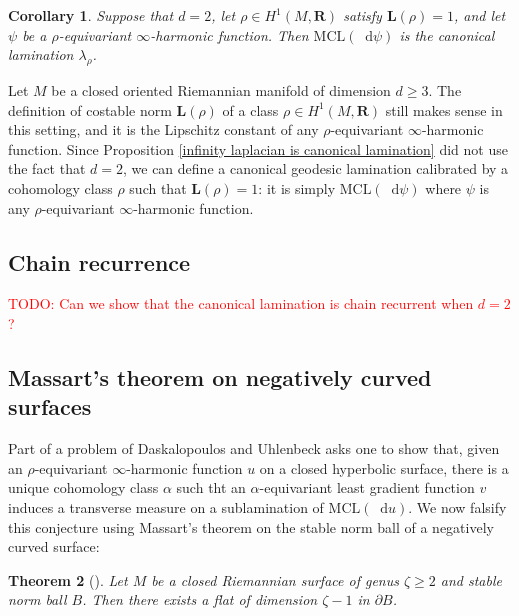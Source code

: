 \documentclass[reqno,11pt]{amsart}
\newcommand{\RR}{\mathbf{R}}
\newcommand*\dif{\mathop{}\!\mathrm{d}}
\newcommand{\MCL}{\mathrm{MCL}}
\newcommand{\Comass}{\mathbf L}
\newtheorem{theorem}{Theorem}[section]
\newtheorem{corollary}[theorem]{Corollary}
\theoremstyle{definition}
\numberwithin{equation}{section}
\newcommand\todo[1]{\textcolor{red}{TODO: #1}}
\begin{document}
\begin{corollary}
Suppose that $d = 2$, let $\rho \in H^1(M, \RR)$ satisfy $\Comass(\rho) = 1$, and let $\psi$ be a $\rho$-equivariant $\infty$-harmonic function.
Then $\MCL(\dif \psi)$ is the canonical lamination $\lambda_\rho$.
\end{corollary}

Let $M$ be a closed oriented Riemannian manifold of dimension $d \geq 3$.
The definition of costable norm $\Comass(\rho)$ of a class $\rho \in H^1(M, \RR)$ still makes sense in this setting, and it is the Lipschitz constant of any $\rho$-equivariant $\infty$-harmonic function.
Since Proposition \ref{infinity laplacian is canonical lamination} did not use the fact that $d = 2$, we can define a canonical geodesic lamination calibrated by a cohomology class $\rho$ such that $\Comass(\rho) = 1$: it is simply $\MCL(\dif \psi)$ where $\psi$ is any $\rho$-equivariant $\infty$-harmonic function.

\subsection{Chain recurrence}
\todo{Can we show that the canonical lamination is chain recurrent when $d = 2$?}

\subsection{Massart's theorem on negatively curved surfaces}
Part of a problem of Daskalopoulos and Uhlenbeck \cite[Conjecture 9.3]{daskalopoulos2020transverse} asks one to show that, given an $\rho$-equivariant $\infty$-harmonic function $u$ on a closed hyperbolic surface, there is a unique cohomology class $\alpha$ such tht an $\alpha$-equivariant least gradient function $v$ induces a transverse measure on a sublamination of $\MCL(\dif u)$.
We now falsify this conjecture using Massart's theorem on the stable norm ball of a negatively curved surface:

\begin{theorem}[{\cite{Massart1997StableNO}}]\label{Massart}
Let $M$ be a closed Riemannian surface of genus $\zeta \geq 2$ and stable norm ball $B$.
Then there exists a flat of dimension $\zeta - 1$ in $\partial B$.
\end{theorem}
\end{document}
